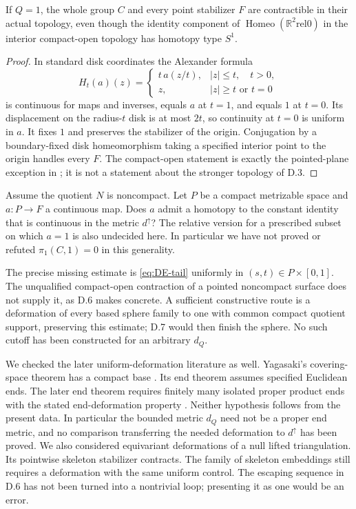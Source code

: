 If $Q=1$, the whole group $C$ and every point stabilizer $F$ are
contractible in their actual topology, even though the identity
component of $\operatorname{Homeo}(\mathbb R^2\mathbin{\mathrm{rel}}0)$
in the interior compact-open topology has homotopy type $S^1$.
\begin{proof}
In standard disk coordinates the Alexander formula
\[
 H_t(a)(z)=
 \begin{cases}t\,a(z/t),&|z|\leq t,\quad t>0,\\
 z,&|z|\geq t\text{ or }t=0
 \end{cases}
\]
is continuous for maps and inverses, equals $a$ at $t=1$, and
equals $1$ at $t=0$.  Its displacement on the radius-$t$ disk
is at most $2t$, so continuity at $t=0$ is uniform in $a$.
It fixes $1$ and preserves the stabilizer of the origin.
Conjugation by a boundary-fixed disk homeomorphism taking a
specified interior point to the origin handles every $F$.
The compact-open statement is exactly the pointed-plane exception
in \cite[Theorem 1.1(i)]{DE_Yagasaki2000}; it is not a statement
about the stronger topology of D.3.
\end{proof}

Assume the quotient $N$ is noncompact.  Let $P$ be a compact
metrizable space and $a:P\to F$ a continuous map.
Does $a$ admit a homotopy to the constant identity that is
continuous in the metric $d^{\uparrow}$?
The relative version for a prescribed subset on which $a=1$ is
also undecided here.  In particular we have not proved or
refuted $\pi_1(C,1)=0$ in this generality.

The precise missing estimate is \eqref{eq:DE-tail} uniformly in
$(s,t)\in P\times[0,1]$.  The unqualified compact-open contraction
of a pointed noncompact surface does not supply it, as D.6 makes
concrete.  A sufficient constructive route is a deformation of
every based sphere family to one with common compact quotient
support, preserving this estimate; D.7 would then finish the
sphere.  No such cutoff has been constructed for an arbitrary
$d_Q$.

We checked the later uniform-deformation literature as well.
Yagasaki's covering-space theorem has a compact base
\cite[Theorem 1.1]{DE_Yagasaki2014}.  Its end theorem assumes
specified Euclidean ends.  The later end theorem requires finitely
many isolated proper product ends with the stated end-deformation
property \cite[Theorem 1.3]{DE_Yagasaki2018}.  Neither hypothesis
follows from the present data.  In particular the bounded metric
$d_Q$ need not be a proper end metric, and no comparison transferring
the needed deformation to $d^{\uparrow}$ has been proved.  We also
considered equivariant deformations of a null lifted triangulation.
Its pointwise skeleton stabilizer contracts.  The family of skeleton
embeddings still requires a deformation with the same uniform control.
The escaping sequence in D.6 has not been
turned into a nontrivial loop; presenting it as one would be an
error.

